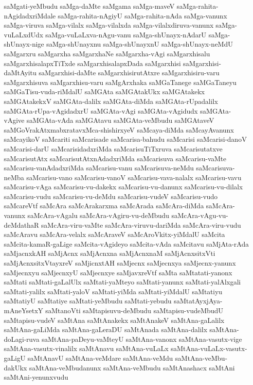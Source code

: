 {saMgati-yeMbudu
saMga-daMte
saMgama
saMga-maveV
saMga-rahita-nAgidadxriMdale
saMga-rahita-nAgiyU
saMga-rahita-nAda
saMga-vanunx
saMga-viruva
saMga-vilalx
saMga-vilalxda
saMga-vilalxdiruva-vanunx
saMga-vuLaLxdUdx
saMga-vuLaLxva-nAgu-vanu
saMga-shUnayx-nAdarU
saMga-shUnayx-nige
saMga-shUnayxnu
saMga-shUnayxnU
saMga-shUnayx-neMdU
saMgarxru
saMgarxha
saMgarxhaNe
saMgarxha-vAgi
saMgarxhisalu
saMgarxhisalapxTiTxde
saMgarxhisalapxDada
saMgarxhisi
saMgarxhisi-daMtAyitu
saMgarxhisi-daMte
saMgarxhisirutAtxre
saMgarxhisiru-varu
saMgarxhisuva
saMgarxhisu-varu
saMgArxhaka
saMGaTanege
saMGaTaneyu
saMGaTisu-vuda-riMdalU
saMGAta
saMGAtakUkx
saMGAtakekx
saMGAtakekxV
saMGAta-dalilx
saMGAta-diMda
saMGAta-rUpadalilx
saMGAta-rUpa-vAgidadxrU
saMGAta-vAgi
saMGAta-vAgidudx
saMGAta-vAgive
saMGAta-vAda
saMGAtavu
saMGAta-veMbudu
saMGAtaveV
saMGoVrakAtxmabxratavxMca-shishirxyeV
saMcaya-diMda
saMcayAvanunx
saMcayikoV
saMcariti
saMcarisade
saMcarisa-bahudu
saMcarisi
saMcarisi-danoV
saMcarisi-darU
saMcarisidadxriMda
saMcarisuTiTxruva
saMcarisutatxve
saMcarisutAtx
saMcarisutAtxnAdadxriMda
saMcarisuva
saMcarisu-vaMte
saMcarisu-vanAdadxriMda
saMcarisu-vanu
saMcarisuva-neMdu
saMcarisuva-neMba
saMcarisu-vano
saMcarisu-vanoV
saMcarisu-vava-nalalx
saMcarisu-vavu
saMcarisu-vAga
saMcarisu-vu-dakekx
saMcarisu-vu-danunx
saMcarisu-vu-dilalx
saMcarisu-vudu
saMcarisu-vu-deMdu
saMcarisu-vudeV
saMcarisu-vudo
saMcareVtf
saMcAra
saMcArakarxma
saMcArada
saMcAra-diMda
saMcAra-vanunx
saMcAra-vAgalu
saMcAra-vAgiru-vu-deMbudu
saMcAra-vAgu-vu-deMdathaR
saMcAra-viru-vaMte
saMcAra-viruvu-dariMda
saMcAra-viru-vudu
saMcAravu
saMcAra-velalx
saMcAraveV
saMcAroVkitx-yiMdalU
saMcita
saMcita-kamaR-gaLige
saMcita-vAgideyo
saMcita-vAda
saMcitavu
saMjAta-rAda
saMjacnxkAH
saMjAcnx
saMjAcnxna
saMjAcnxnaM
saMjAcnxsitxVti
saMjAcnxsitxVtayxreV
saMjicnxtAH
saMjecnx
saMjecnxya
saMjecnx-yanunx
saMjecnxyu
saMjecnxyU
saMjecnxye
saMjavxreVtf
saMta
saMtatati-yanonx
saMtati
saMtati-gaLalUlx
saMtati-yaMteyo
saMtati-yanunx
saMtati-yalAlxgali
saMtati-yalilx
saMtati-yaloV
saMtati-yiMda
saMtati-yiMdalU
saMtatiyu
saMtatiyU
saMtatiye
saMtati-yeMbudu
saMtati-yebudu
saMtatAyxjAya-mAneYsetxY
saMtanoVti
saMtapisuvu-deMbudu
saMtapisu-vudeMbudU
saMtapisu-vudeV
saMtAna
saMtAnakekx
saMtAnakeV
saMtAna-gaLalilx
saMtAna-gaLiMda
saMtAna-gaLeraDU
saMtAnada
saMtAna-dalilx
saMtAna-doLagi-ruva
saMtAna-paDeyu-vaMteyU
saMtAna-vanonx
saMtAna-vasutx-vige
saMtAna-vasutx-vinalilx
saMtAnavu
saMtAna-vuLaLx
saMtAna-vuLaLx-vasutx-gaLigU
saMtAnavU
saMtAna-veMdare
saMtAna-veMdu
saMtAna-veMbu-dakUkx
saMtAna-veMbudanunx
saMtAna-veMbudu
saMtAnashacx
saMtAni
saMtAni-yenunxvudu
}
